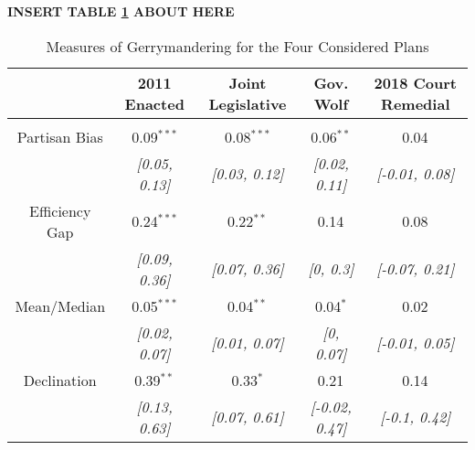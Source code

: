 


 \begin{center}\textbf{INSERT TABLE \ref{tab:gerry} ABOUT HERE} \end{center}


\begin{table}[!htbp] \centering 
  \caption{Measures of Gerrymandering for the Four Considered Plans} 
  \label{tab:gerry} 
\begin{tabular}{@{\extracolsep{-5pt}} ccccc} 
 & 2011 Enacted & Joint Legislative & Gov. Wolf & 2018 Court Remedial \\ 
\hline \\[-1.8ex] 
Partisan Bias & 0.09$^{***}$ & 0.08$^{***}$ & 0.06$^{**}$ & 0.04$^{}$ \\ 
 & {\small\textit{[0.05, 0.13]}} & {\small\textit{[0.03, 0.12]}} & {\small\textit{[0.02, 0.11]}} & {\small\textit{[-0.01, 0.08]}} \\ 
Efficiency Gap & 0.24$^{***}$ & 0.22$^{**}$ & 0.14$^{}$ & 0.08$^{}$ \\ 
 & {\small\textit{[0.09, 0.36]}} & {\small\textit{[0.07, 0.36]}} & {\small\textit{[0, 0.3]}} & {\small\textit{[-0.07, 0.21]}} \\ 
Mean/Median & 0.05$^{***}$ & 0.04$^{**}$ & 0.04$^{*}$ & 0.02$^{}$ \\ 
 & {\small\textit{[0.02, 0.07]}} & {\small\textit{[0.01, 0.07]}} & {\small\textit{[0, 0.07]}} & {\small\textit{[-0.01, 0.05]}} \\ 
Declination & 0.39$^{**}$ & 0.33$^{*}$ & 0.21$^{}$ & 0.14$^{}$ \\ 
 & {\small\textit{[0.13, 0.63]}} & {\small\textit{[0.07, 0.61]}} & {\small\textit{[-0.02, 0.47]}} & {\small\textit{[-0.1, 0.42]}} \\ 
\end{tabular}
\end{table}
 
 
